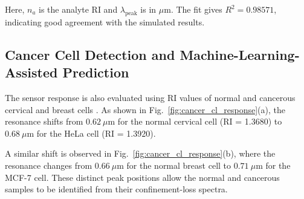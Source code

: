 \documentclass[ACS,STIX2COL]{WileyNJD-v2}
\begin{document}
Here, $n_a$ is the analyte RI and $\lambda_{\mathrm{peak}}$ is in $\mu$m. The fit gives $R^2=0.98571$, indicating good agreement with the simulated results.




\subsection{Cancer Cell Detection and Machine-Learning-Assisted Prediction}

The sensor response is also evaluated using RI values of normal and cancerous cervical and breast cells \cite{ashrafian2025highly}. As shown in Fig.~\ref{fig:cancer_cl_response}(a), the resonance shifts from $0.62~\mu\mathrm{m}$ for the normal cervical cell (RI = 1.3680) to $0.68~\mu\mathrm{m}$ for the HeLa cell (RI = 1.3920).

A similar shift is observed in Fig.~\ref{fig:cancer_cl_response}(b), where the resonance changes from $0.66~\mu\mathrm{m}$ for the normal breast cell to $0.71~\mu\mathrm{m}$ for the MCF-7 cell. These distinct peak positions allow the normal and cancerous samples to be identified from their confinement-loss spectra.
\end{document}

